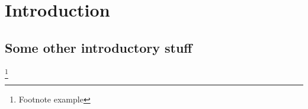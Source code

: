 \chapter{Introduction}
\lipsum[1]

\section{Some other introductory stuff}
\lipsum[2] \footnote{Footnote example}
\lipsum[4]

\lipsum[5]